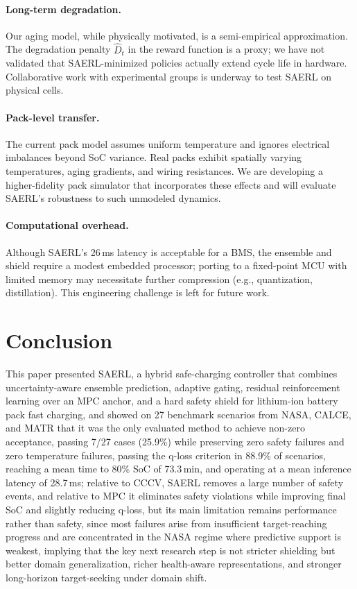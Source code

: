 \documentclass[%
 aip,
 amsmath,amssymb,
reprint, onecolumn %
]{revtex4-1}
\begin{document}
\paragraph{Long-term degradation.}
Our aging model, while physically motivated, is a semi-empirical approximation. The degradation penalty $\hat{D}_t$ in the reward function is a proxy; we have not validated that SAERL-minimized policies actually extend cycle life in hardware. Collaborative work with experimental groups is underway to test SAERL on physical cells.

\paragraph{Pack-level transfer.}
The current pack model assumes uniform temperature and ignores electrical imbalances beyond SoC variance. Real packs exhibit spatially varying temperatures, aging gradients, and wiring resistances. We are developing a higher-fidelity pack simulator that incorporates these effects and will evaluate SAERL's robustness to such unmodeled dynamics.

\paragraph{Computational overhead.}
Although SAERL's 26\,ms latency is acceptable for a BMS, the ensemble and shield require a modest embedded processor; porting to a fixed-point MCU with limited memory may necessitate further compression (e.g., quantization, distillation). This engineering challenge is left for future work.

\section{Conclusion}
\label{sec:conclusion}

This paper presented SAERL, a hybrid safe-charging controller that combines uncertainty-aware ensemble prediction, adaptive gating, residual reinforcement learning over an MPC anchor, and a hard safety shield for lithium-ion battery pack fast charging, and showed on 27 benchmark scenarios from NASA, CALCE, and MATR that it was the only evaluated method to achieve non-zero acceptance, passing 7/27 cases (25.9\%) while preserving zero safety failures and zero temperature failures, passing the q-loss criterion in 88.9\% of scenarios, reaching a mean time to 80\% SoC of 73.3\,min, and operating at a mean inference latency of 28.7\,ms; relative to CCCV, SAERL removes a large number of safety events, and relative to MPC it eliminates safety violations while improving final SoC and slightly reducing q-loss, but its main limitation remains performance rather than safety, since most failures arise from insufficient target-reaching progress and are concentrated in the NASA regime where predictive support is weakest, implying that the key next research step is not stricter shielding but better domain generalization, richer health-aware representations, and stronger long-horizon target-seeking under domain shift.
\end{document}
